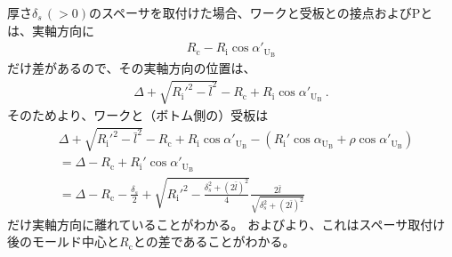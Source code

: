 \clearpage
\index{\yomiSpacerThickness@\nameSpacerThickness}厚さ$\delta_s\,(>0)$のスペーサを取付けた場合、ワークと受板との接点および\TableCenter Pとは、実軸方向に
\begin{align*}
  R_\mathrm c-R_\mathrm i\cos\alpha'_{\mathrm U_\mathrm B}
\end{align*}
だけ差があるので、その実軸方向の位置は、
\begin{align*}
  \Delta+\sqrt{R_\mathrm i'^2-\bar l^2}-R_\mathrm c+R_\mathrm i\cos\alpha'_{\mathrm U_\mathrm B}\ .
\end{align*}
そのためより、ワークと（ボトム側の）受板は
\begin{align*}
  &  \Delta+\sqrt{R_\mathrm i'^2-\bar l^2}-R_\mathrm c+R_\mathrm i\cos\alpha'_{\mathrm U_\mathrm B}
     -\left(R_\mathrm i'\cos\alpha_{\mathrm U_\mathrm B}+\rho\cos\alpha'_{\mathrm U_\mathrm B}\right)\\
  &= \Delta-R_\mathrm c+R_\mathrm i'\cos\alpha'_{\mathrm U_\mathrm B}\\
  &= \Delta-R_\mathrm c
     -\frac{\delta_s}2+\sqrt{R_\mathrm i'^2-\frac{\delta_s^2+(2\bar l)^2}4}\frac{2\bar l}{\sqrt{\delta_s^2+(2\bar l)^2}}
\end{align*}
だけ実軸方向に離れていることがわかる。
およびより、これはスペーサ取付け後のモールド中心と\CenterCurvature$R_\mathrm c$との差であることがわかる。
